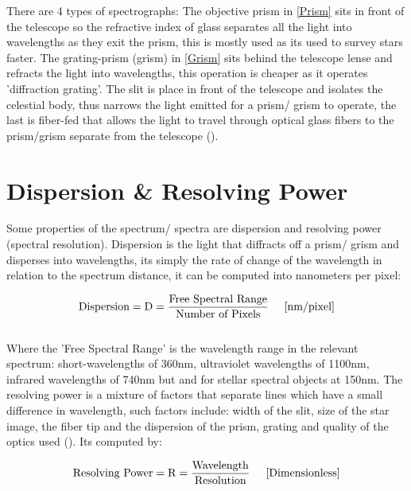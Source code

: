 \documentclass[12pt]{article}
\begin{document}
\noindent There are 4 types of spectrographs: The objective prism in \cref{Prism} sits in front of the telescope so the refractive index of glass separates all the light into wavelengths as they exit the prism, this is mostly used as its used to survey stars faster. The grating-prism (grism) in \cref{Grism} sits behind the telescope lense and refracts the light into wavelengths, this operation is cheaper as it operates 'diffraction grating'. The slit is place in front of the telescope and isolates the celestial body, thus narrows the light emitted for a prism/ grism to operate, the last is fiber-fed that allows the light to travel through optical glass fibers to the prism/grism separate from the telescope (\cite{ImageProcessing}).

\section{Dispersion \& Resolving Power}
\label{Section 2}

Some properties of the spectrum/ spectra are dispersion and resolving power (spectral resolution). Dispersion is the light that diffracts off a prism/ grism and disperses into wavelengths, its simply the rate of change of the wavelength in relation to the spectrum distance, it can be computed into nanometers per pixel: 

\begin{equation}
\centering
\textnormal{Dispersion} = \textnormal{D}= \dfrac{\textnormal{Free Spectral Range}}{\textnormal{Number of Pixels}} \hspace{0.5cm }\textnormal{[nm/pixel]}
\label{Dispersion Equation}
\end{equation} \\ [-0.5cm]

\noindent Where the 'Free Spectral Range' is the wavelength range in the relevant spectrum: short-wavelengths of 360nm, ultraviolet wavelengths of 1100nm, infrared wavelengths of 740nm but and for stellar spectral objects at 150nm. The resolving power is a mixture of factors that separate lines which have a small difference in wavelength, such factors include: width of the slit, size of the star image, the fiber tip and the dispersion of the prism, grating and quality of the optics used (\cite{ImageProcessing}). Its computed by: 

\begin{equation}
\centering
\textnormal{Resolving Power} = \textnormal{R} = \dfrac{\textnormal{Wavelength}}{\textnormal{Resolution}} \hspace{0.5cm }\textnormal{[Dimensionless]}
\label{Resolving Power Equation}
\end{equation} \\ [-0.5cm]
\end{document}
